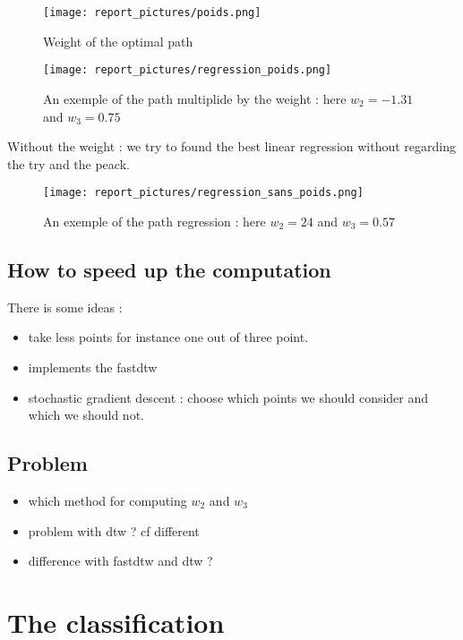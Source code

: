 \documentclass[a4,12pt]{article}
\begin{document}
	\begin{figure}[H]
		\centering
		\texttt{[image: report\_pictures/poids.png]}
		\caption{Weight of the optimal path}
		\label{reg_poids}
	\end{figure}	
	
	\begin{figure}[H]
		\centering
		\texttt{[image: report\_pictures/regression\_poids.png]}
		\caption{An exemple of the path multiplide by the weight : here $w_2=-1.31$ and $w_3=0.75$	}
		\label{reg_poids}
	\end{figure}	
	
	Without the weight : we try to found the best linear regression without regarding the try and the peack.
	
	\begin{figure}[H]
		\centering
		\texttt{[image: report\_pictures/regression\_sans\_poids.png]}
		\caption{An exemple of the path regression : here $w_2=24$ and $w_3=0.57$}
		\label{reg_sans_poids}
	\end{figure}
	
	\subsection{How to speed up the computation}
	
	There is some ideas :
	
	\begin{itemize}
		\item take less points for instance one out of three point.
		\item implements the fastdtw
		\item stochastic gradient descent : choose which points we should consider and which we should not.
	\end{itemize}
	
	\subsection{Problem}
	
	\begin{itemize}
		\item which method for computing $w_2$ and $w_3$
		\item problem with dtw ? cf different
		\item difference with fastdtw and dtw ?
	\end{itemize}
	
	\section{The classification}
	
\end{document}
